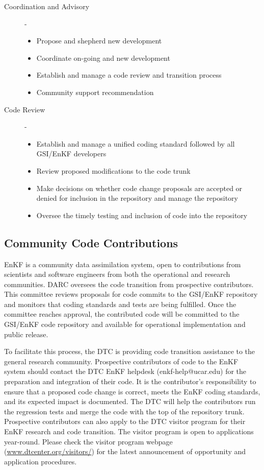 \begin{description}
\item[Coordination and Advisory]- 
\begin{itemize}
\item Propose and shepherd new development
\item Coordinate on-going and new development
\item Establish and manage a code review and transition process
\item Community support recommendation
\end{itemize}
\item[Code Review]- 
\begin{itemize}
\item Establish and manage a unified coding standard followed by all GSI/EnKF developers
\item Review proposed modifications to the code trunk
\item Make decisions on whether code change proposals are accepted or denied for
inclusion in the repository and manage the repository
\item Oversee the timely testing and inclusion of code into the repository
\end{itemize}
\end{description}

\subsection{Community Code Contributions}

EnKF is a community data assimilation system, open to contributions from scientists and software engineers from both the operational and research communities. DARC oversees the code transition from prospective contributors. This committee reviews proposals for code commits to the GSI/EnKF repository and monitors that coding standards and tests are being fulfilled. Once the committee reaches approval, the contributed code will be committed to the GSI/EnKF code repository and available for operational implementation and public release. 

To facilitate this process, the DTC is providing code transition assistance to the general research community. Prospective contributors of code to the EnKF system should contact the DTC EnKF helpdesk (enkf-help@ucar.edu) for the preparation and integration of their code.  It is the contributor's responsibility to ensure that a proposed code change is correct,  meets the EnKF coding standards, and its expected impact is documented. The DTC will help the contributors run the regression tests and merge the code with the top of the repository trunk. Prospective contributors can also apply to the DTC visitor program for their EnKF research and code transition. The visitor program is open to applications year-round. Please check the visitor program webpage (\url{www.dtcenter.org/visitors/})  for the latest announcement of opportunity and application procedures.  


